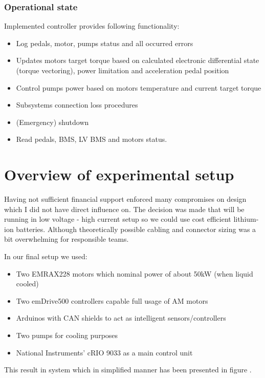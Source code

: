 
\subsection{Operational state}
Implemented controller provides following functionality:
\begin{itemize}
    \item Log pedals, motor, pumps status and all occurred errors
    \item Updates motors target torque based on calculated electronic differential state (torque vectoring), power limitation and acceleration pedal position
    \item Control pumps power based on motors temperature and current target torque
    \item Subsystems connection loss procedures
    \item (Emergency) shutdown
    \item Read pedals, BMS, LV BMS and motors status.
\end{itemize}


\chapter{Overview of experimental setup}
Having not sufficient financial support enforced many compromises on design which I did not have direct influence on. The decision was made that will be running in low voltage - high current setup so we could use cost efficient lithium-ion batteries. 
Although theoretically possible cabling and connector sizing was a bit overwhelming for responsible teams.

In our final setup we used:
\begin{itemize}
    \item Two EMRAX228 motors which nominal power of about 50kW (when liquid cooled)
    \item Two emDrive500 controllers capable full usage of AM motors
    \item Arduinos with CAN shields to act as intelligent sensors/controllers
    \item Two  pumps for cooling purposes
    \item National Instruments' cRIO 9033 as a main control unit
\end{itemize}

This result in system which in simplified manner has been presented in figure .

